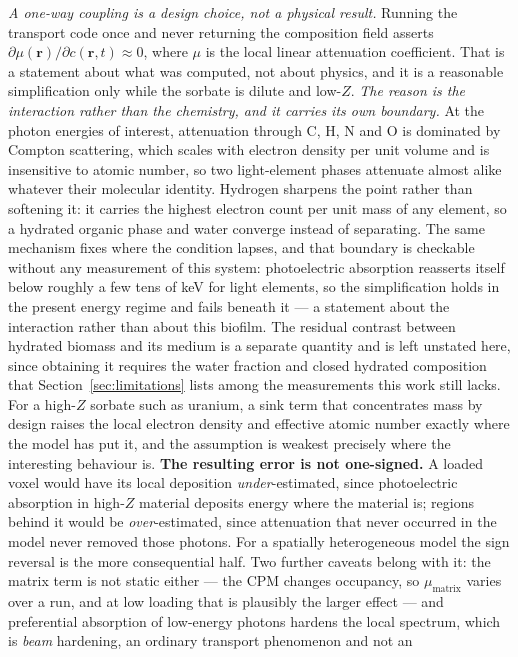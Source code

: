 \documentclass[11pt]{article}
\begin{document}
\emph{A one-way coupling is a design choice, not a physical result.} Running the transport code
once and never returning the composition field asserts
$\partial\mu(\mathbf{r})/\partial c(\mathbf{r},t) \approx 0$, where $\mu$ is the local linear
attenuation coefficient. That is a statement about what was computed, not about physics, and it
is a reasonable simplification only while the sorbate is dilute and low-$Z$. \emph{The reason is the
interaction rather than the chemistry, and it carries its own boundary.} At the photon energies
of interest, attenuation through C, H, N and O is dominated by Compton scattering, which scales
with electron density per unit volume and is insensitive to atomic number, so two light-element
phases attenuate almost alike whatever their molecular identity. Hydrogen sharpens the point
rather than softening it: it carries the highest electron count per unit mass of any element, so
a hydrated organic phase and water converge instead of separating. The same mechanism fixes where
the condition lapses, and that boundary is checkable without any measurement of this system:
photoelectric absorption reasserts itself below roughly a few tens of keV for light elements, so
the simplification holds in the present energy regime and fails beneath it --- a statement about
the interaction rather than about this biofilm. The residual contrast between hydrated biomass
and its medium is a separate quantity and is left unstated here, since obtaining it requires the
water fraction and closed hydrated composition that Section~\ref{sec:limitations} lists among the
measurements this work still lacks. For a high-$Z$
sorbate such as uranium, a sink term that concentrates mass by design raises the local electron
density and effective atomic number exactly where the model has put it, and the assumption is
weakest precisely where the interesting behaviour is. \textbf{The resulting error is not
one-signed.} A loaded voxel would have its local deposition \emph{under}-estimated, since
photoelectric absorption in high-$Z$ material deposits energy where the material is; regions
behind it would be \emph{over}-estimated, since attenuation that never occurred in the model
never removed those photons. For a spatially heterogeneous model the sign reversal is the more
consequential half. Two further caveats belong with it: the matrix term is not static either ---
the CPM changes occupancy, so $\mu_{\mathrm{matrix}}$ varies over a run, and at low loading that
is plausibly the larger effect --- and preferential absorption of low-energy photons hardens the
local spectrum, which is \emph{beam} hardening, an ordinary transport phenomenon and not an
\end{document}
